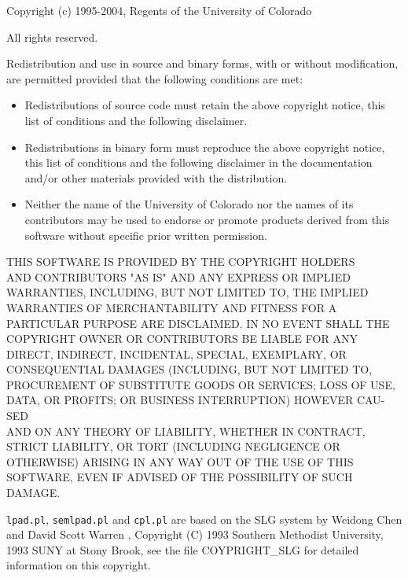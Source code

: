 \documentclass[a4paper,10pt]{article}
\newcommand{\href}[2]{\Link[#1]{}{} #2 \EndLink}
\begin{document}
\vspace{3mm}

Copyright (c) 1995-2004, Regents of the University of Colorado

All rights reserved.

Redistribution and use in source and binary forms, with or without
modification, are permitted provided that the following conditions
are met:

\begin{itemize}
\item
Redistributions of source code must retain the above copyright
notice, this list of conditions and the following disclaimer.
\item
Redistributions in binary form must reproduce the above copyright
notice, this list of conditions and the following disclaimer in the
documentation and/or other materials provided with the distribution.
\item
Neither the name of the University of Colorado nor the names of its
contributors may be used to endorse or promote products derived from
this software without specific prior written permission.
\end{itemize}
THIS SOFTWARE IS PROVIDED BY THE COPYRIGHT HOLDERS \\ AND CONTRIBUTORS
"AS IS" AND ANY EXPRESS OR IMPLIED WARRANTIES, INCLUDING, BUT NOT
LIMITED TO, THE IMPLIED WARRANTIES OF MERCHANTABILITY AND FITNESS
FOR A PARTICULAR PURPOSE ARE DISCLAIMED. IN NO EVENT SHALL THE
COPYRIGHT OWNER OR CONTRIBUTORS BE LIABLE FOR ANY DIRECT, INDIRECT,
INCIDENTAL, SPECIAL, EXEMPLARY, OR CONSEQUENTIAL DAMAGES (INCLUDING,
BUT NOT LIMITED TO, PROCUREMENT OF SUBSTITUTE GOODS OR SERVICES;
LOSS OF USE, DATA, OR PROFITS; OR BUSINESS INTERRUPTION) HOWEVER
CAU-SED
\\ AND ON ANY THEORY OF LIABILITY, WHETHER IN CONTRACT, STRICT
LIABILITY, OR TORT (INCLUDING NEGLIGENCE OR OTHERWISE) ARISING IN
ANY WAY OUT OF THE USE OF THIS SOFTWARE, EVEN IF ADVISED OF THE
POSSIBILITY OF SUCH DAMAGE.

\texttt{lpad.pl}, \texttt{semlpad.pl} and \texttt{cpl.pl} are based on the SLG system
by Weidong Chen and \href{http://www.cs.sunysb.edu/\string ~warren/}{David Scott Warren},  
Copyright (C) 1993 Southern Methodist University, 1993 SUNY at Stony Brook, see the file COYPRIGHT\_SLG for detailed information on this copyright.



\end{document}
